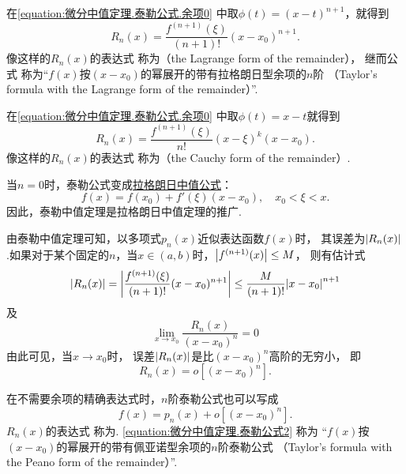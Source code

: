 在\cref{equation:微分中值定理.泰勒公式.余项0} 中取\(\phi(t) = (x-t)^{n+1}\)，就得到
\begin{equation}\label{equation:微分中值定理.泰勒公式.余项1}
	R_n(x) = \frac{f^{(n+1)}(\xi)}{(n+1)!} (x-x_0)^{n+1}.
\end{equation}
像这样的\(R_n(x)\)的表达式 
称为（the Lagrange form of the remainder），
继而公式 
称为“\(f(x)\)按\((x-x_0)\)的幂展开的带有拉格朗日型余项的\(n\)阶
（Taylor's formula with the Lagrange form of the remainder）”.

在\cref{equation:微分中值定理.泰勒公式.余项0} 中取\(\phi(t) = x-t\)就得到
\begin{equation}\label{equation:微分中值定理.泰勒公式.余项4}
	R_n(x) = \frac{f^{(n+1)}(\xi)}{n!} (x-\xi)^k (x-x_0).
\end{equation}
像这样的\(R_n(x)\)的表达式 
称为（the Cauchy form of the remainder）.

当\(n=0\)时，泰勒公式变成\hyperref[equation:微分中值定理.拉格朗日中值公式]{拉格朗日中值公式}：\[
	f(x) = f(x_0) + f'(\xi) (x-x_0), \quad x_0 < \xi < x.
\]
因此，泰勒中值定理是拉格朗日中值定理的推广.

由泰勒中值定理可知，以多项式\(p_n(x)\)近似表达函数\(f(x)\)时，
其误差为\(\abs{R_n(x)}\).如果对于某个固定的\(n\)，当\(x\in(a,b)\)时，\(\abs{f^{(n+1)}(x)} \leq M\)，
则有估计式\begin{equation}\label{equation:微分中值定理.泰勒公式.误差1}
	\abs{R_n(x)}
	= \abs{\frac{f^{(n+1)}(\xi)}{(n+1)!} (x-x_0)^{n+1}}
	\leq \frac{M}{(n+1)!} \abs{x-x_0}^{n+1}
\end{equation}
及\[
	\lim\limits_{x \to x_0} \frac{R_n(x)}{(x-x_0)^n} = 0
\]
由此可见，当\(x \to x_0\)时，
误差\(\abs{R_n(x)}\)是比\((x-x_0)^n\)高阶的无穷小，
即\begin{equation}\label{equation:微分中值定理.泰勒公式.余项2}
	R_n(x) = o[(x-x_0)^n].
\end{equation}

在不需要余项的精确表达式时，\(n\)阶泰勒公式也可以写成
\begin{equation}\label{equation:微分中值定理.泰勒公式2}
	f(x) = p_n(x) + o[(x - x_0)^n].
\end{equation}
\(R_n(x)\)的表达式  称为.
\cref{equation:微分中值定理.泰勒公式2} 称为
“\(f(x)\)按\((x-x_0)\)的幂展开的带有佩亚诺型余项的\(n\)阶泰勒公式
（Taylor's formula with the Peano form of the remainder）”.

